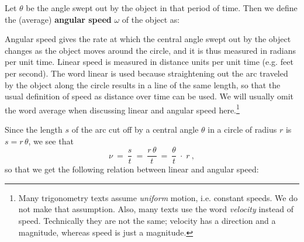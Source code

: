 \begin{center}\end{center}

Let $\theta$ be the angle swept out by the object in that period of time. Then we define the
(average) \textbf{angular speed} $\omega$ of the object as:

\begin{center}\end{center}

Angular speed gives the rate at which the central angle swept out by the object changes as the
object moves around the circle, and it is thus measured in radians per unit time. Linear speed is
measured in distance units per unit time (e.g. feet per second). The word linear is used because
straightening out the arc traveled by the object along the circle results in a line of the same
length, so that the usual definition of speed as distance over time can be used. We will usually
omit the word average when discussing linear and angular speed here.\footnote{Many trigonometry
texts assume \emph{uniform} motion, i.e. constant speeds. We do not make that assumption. Also, many
texts use the word \emph{velocity} instead of speed. Technically they are not the same; velocity has
a direction and a magnitude, whereas speed is just a magnitude.}

Since the length $s$ of the arc cut off by a central angle $\theta$ in a circle of radius $r$ is
$s=r\,\theta$, we see that
\begin{displaymath}
 \nu ~=~ \frac{s}{t} ~=~ \frac{r\,\theta}{t} ~=~ \frac{\theta}{t} \;\cdot\; r ~,
\end{displaymath}
so that we get the following relation between linear and angular speed:

